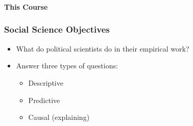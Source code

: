 \documentclass[xcolor=svgnames,9pt,english,aspectratio=169,t]{beamer}
\begin{document}






\begin{frame}\frametitle{}
{\Large\textbf{This Course}}
\end{frame}


\begin{frame}
  \frametitle{Social Science Objectives}\pause
\begin{itemize}\itemsep1em
\item What do political scientists do in their empirical work?\pause
\item Answer three types of questions: 
\begin{itemize}\itemsep0.5em\medskip
\item Descriptive
\item Predictive
\item Causal (explaining)
\end{itemize}
\end{itemize}
\end{frame}
\end{document}

